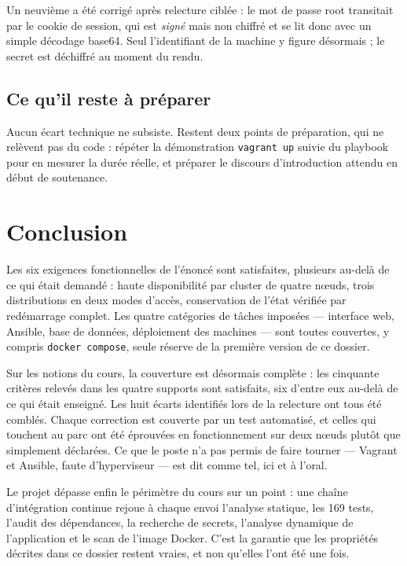 \documentclass[11pt,a4paper]{article}
\begin{document}
Un neuvième a été corrigé après relecture ciblée : le mot de passe root
transitait par le cookie de session, qui est \emph{signé} mais non chiffré et
se lit donc avec un simple décodage base64. Seul l'identifiant de la machine y
figure désormais ; le secret est déchiffré au moment du rendu.

\subsection*{Ce qu'il reste à préparer}

Aucun écart technique ne subsiste. Restent deux points de préparation, qui ne relèvent pas du code :
répéter la démonstration \texttt{vagrant up} suivie du playbook pour en mesurer la durée réelle, et
préparer le discours d'introduction attendu en début de soutenance.

\section*{Conclusion}
Les six exigences fonctionnelles de l'énoncé sont satisfaites, plusieurs au-delà de ce qui était
demandé : haute disponibilité par cluster de quatre n\oe{}uds, trois distributions en deux modes
d'accès, conservation de l'état vérifiée par redémarrage complet. Les quatre catégories de tâches
imposées --- interface web, Ansible, base de données, déploiement des machines --- sont toutes
couvertes, y compris \texttt{docker compose}, seule réserve de la première version de ce dossier.

Sur les notions du cours, la couverture est désormais complète : les cinquante critères relevés dans
les quatre supports sont satisfaits, six d'entre eux au-delà de ce qui était enseigné. Les huit
écarts identifiés lors de la relecture ont tous été comblés. Chaque correction est couverte par un
test automatisé, et celles qui touchent au parc ont été éprouvées en fonctionnement sur deux n\oe{}uds
plutôt que simplement déclarées. Ce que le poste n'a pas permis de faire tourner --- Vagrant et
Ansible, faute d'hyperviseur --- est dit comme tel, ici et à l'oral.

Le projet dépasse enfin le périmètre du cours sur un point : une chaîne d'intégration continue
rejoue à chaque envoi l'analyse statique, les 169 tests, l'audit des dépendances, la recherche de
secrets, l'analyse dynamique de l'application et le scan de l'image Docker. C'est la garantie que
les propriétés décrites dans ce dossier restent vraies, et non qu'elles l'ont été une fois.
\end{document}
